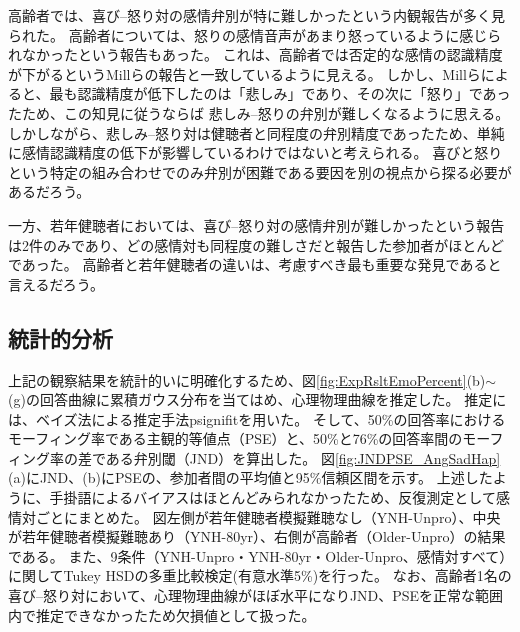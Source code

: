 高齢者では、喜び--怒り対の感情弁別が特に難しかったという内観報告が多く見られた。
高齢者については、怒りの感情音声があまり怒っているように感じられなかったという報告もあった。
これは、高齢者では否定的な感情の認識精度が下がるというMillらの報告\cite{mill2009age}と一致しているように見える。
しかし、Millらによると、最も認識精度が低下したのは「悲しみ」であり、その次に「怒り」であったため、この知見に従うならば
悲しみ--怒りの弁別が難しくなるように思える。
しかしながら、悲しみ--怒り対は健聴者と同程度の弁別精度であったため、単純に感情認識精度の低下が影響しているわけではないと考えられる。
喜びと怒りという特定の組み合わせでのみ弁別が困難である要因を別の視点から探る必要があるだろう。


一方、若年健聴者においては、喜び--怒り対の感情弁別が難しかったという報告は2件のみであり、どの感情対も同程度の難しさだと報告した参加者がほとんどであった。
高齢者と若年健聴者の違いは、考慮すべき最も重要な発見であると言えるだろう。






\clearpage
\subsection{統計的分析}
\label{sec:Statistics}
上記の観察結果を統計的いに明確化するため、図\ref{fig:ExpRsltEmoPercent}(b)$\sim$(g)の回答曲線に累積ガウス分布を当てはめ、心理物理曲線を推定した。
推定には、ベイズ法による推定手法psignifit\cite{schutt2016painfree}を用いた。
そして、50\%の回答率におけるモーフィング率である主観的等値点（PSE）と、50\%と76\%の回答率間のモーフィング率の差である弁別閾（JND）を算出した。 
図\ref{fig:JNDPSE_AngSadHap}(a)にJND、(b)にPSEの、参加者間の平均値と95\%信頼区間を示す。
上述したように、手掛語によるバイアスはほとんどみられなかったため、反復測定として感情対ごとにまとめた。
図左側が若年健聴者模擬難聴なし（YNH-Unpro）、中央が若年健聴者模擬難聴あり（YNH-80yr）、右側が高齢者（Older-Unpro）の結果である。
また、9条件（YNH-Unpro・YNH-80yr・Older-Unpro、感情対すべて）に関してTukey HSDの多重比較検定(有意水準5\%)を行った。
なお、高齢者1名の喜び--怒り対において、心理物理曲線がほぼ水平になりJND、PSEを正常な範囲内で推定できなかったため欠損値として扱った。

